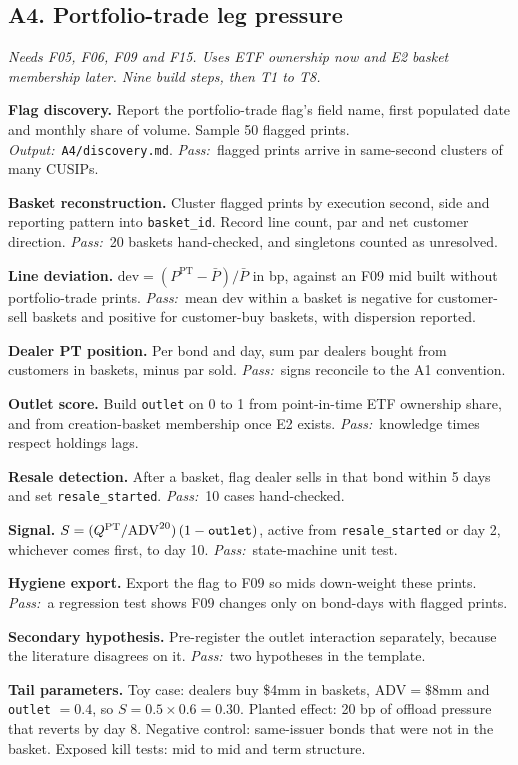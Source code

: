 \documentclass[11pt,letterpaper]{article}
\makeatletter
\newcommand{\code}[1]{\texttt{#1}}
\newcommand{\Pm}{\bar{P}}                 %
\newcommand{\ADV}{\mathrm{ADV}}
\newcommand*{\twodigit}[1]{\expandafter\@twodigit\csname c@#1\endcsname}
\newcommand*{\@twodigit}[1]{\ifnum#1<10 0\fi\number#1}
\newcommand{\stepname}[1]{\textbf{#1.}}
\newcommand{\Out}{\textit{Output:}~}
\newcommand{\Pass}{\textit{Pass:}~}
\makeatother
\begin{document}
\subsection{A4. Portfolio-trade leg pressure}
\emph{Needs F05, F06, F09 and F15. Uses ETF ownership now and E2 basket membership later. Nine build steps, then T1 to T8.}
\begin{ladder}[label=\textbf{A4.\twodigit*}]
\item \stepname{Flag discovery} Report the portfolio-trade flag's field name, first populated date and monthly share of volume. Sample 50 flagged prints. \Out \code{A4/discovery.md}. \Pass flagged prints arrive in same-second clusters of many CUSIPs.
\item \stepname{Basket reconstruction} Cluster flagged prints by execution second, side and reporting pattern into \code{basket_id}. Record line count, par and net customer direction. \Pass 20 baskets hand-checked, and singletons counted as unresolved.
\item \stepname{Line deviation} $\mathrm{dev}=(P^{\mathrm{PT}}-\Pm)/\Pm$ in bp, against an F09 mid built without portfolio-trade prints. \Pass mean dev within a basket is negative for customer-sell baskets and positive for customer-buy baskets, with dispersion reported.
\item \stepname{Dealer PT position} Per bond and day, sum par dealers bought from customers in baskets, minus par sold. \Pass signs reconcile to the A1 convention.
\item \stepname{Outlet score} Build \code{outlet} on 0 to 1 from point-in-time ETF ownership share, and from creation-basket membership once E2 exists. \Pass knowledge times respect holdings lags.
\item \stepname{Resale detection} After a basket, flag dealer sells in that bond within 5 days and set \code{resale_started}. \Pass 10 cases hand-checked.
\item \stepname{Signal} $S=(Q^{\mathrm{PT}}/\ADV^{20})\,(1-\text{\code{outlet}})$, active from \code{resale_started} or day 2, whichever comes first, to day 10. \Pass state-machine unit test.
\item \stepname{Hygiene export} Export the flag to F09 so mids down-weight these prints. \Pass a regression test shows F09 changes only on bond-days with flagged prints.
\item \stepname{Secondary hypothesis} Pre-register the outlet interaction separately, because the literature disagrees on it. \Pass two hypotheses in the template.
\end{ladder}
\textbf{Tail parameters.} Toy case: dealers buy \$4mm in baskets, $\ADV=\$8$mm and \code{outlet} $=0.4$, so $S=0.5\times0.6=0.30$. Planted effect: 20 bp of offload pressure that reverts by day 8. Negative control: same-issuer bonds that were not in the basket. Exposed kill tests: mid to mid and term structure.
\end{document}
